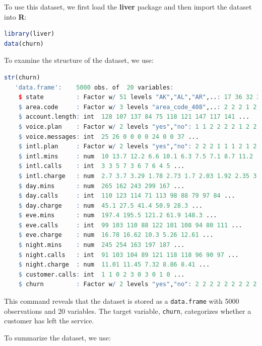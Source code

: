 \documentclass[
  11pt,
]{book}
\newcommand{\passthrough}[1]{#1}
\theoremstyle{definition}
\theoremstyle{definition}
\theoremstyle{definition}
\theoremstyle{definition}
\theoremstyle{remark}
\begin{document}
To use this dataset, we first load the \textbf{liver} package and then import the dataset into \textbf{R}:

\begin{lstlisting}[language=R]
library(liver)
data(churn)  
\end{lstlisting}

To examine the structure of the dataset, we use:

\begin{lstlisting}[language=R]
str(churn)  
   'data.frame':    5000 obs. of  20 variables:
    $ state         : Factor w/ 51 levels "AK","AL","AR",..: 17 36 32 36 37 2 20 25 19 50 ...
    $ area.code     : Factor w/ 3 levels "area_code_408",..: 2 2 2 1 2 3 3 2 1 2 ...
    $ account.length: int  128 107 137 84 75 118 121 147 117 141 ...
    $ voice.plan    : Factor w/ 2 levels "yes","no": 1 1 2 2 2 2 1 2 2 1 ...
    $ voice.messages: int  25 26 0 0 0 0 24 0 0 37 ...
    $ intl.plan     : Factor w/ 2 levels "yes","no": 2 2 2 1 1 1 2 1 2 1 ...
    $ intl.mins     : num  10 13.7 12.2 6.6 10.1 6.3 7.5 7.1 8.7 11.2 ...
    $ intl.calls    : int  3 3 5 7 3 6 7 6 4 5 ...
    $ intl.charge   : num  2.7 3.7 3.29 1.78 2.73 1.7 2.03 1.92 2.35 3.02 ...
    $ day.mins      : num  265 162 243 299 167 ...
    $ day.calls     : int  110 123 114 71 113 98 88 79 97 84 ...
    $ day.charge    : num  45.1 27.5 41.4 50.9 28.3 ...
    $ eve.mins      : num  197.4 195.5 121.2 61.9 148.3 ...
    $ eve.calls     : int  99 103 110 88 122 101 108 94 80 111 ...
    $ eve.charge    : num  16.78 16.62 10.3 5.26 12.61 ...
    $ night.mins    : num  245 254 163 197 187 ...
    $ night.calls   : int  91 103 104 89 121 118 118 96 90 97 ...
    $ night.charge  : num  11.01 11.45 7.32 8.86 8.41 ...
    $ customer.calls: int  1 1 0 2 3 0 3 0 1 0 ...
    $ churn         : Factor w/ 2 levels "yes","no": 2 2 2 2 2 2 2 2 2 2 ...
\end{lstlisting}

This command reveals that the dataset is stored as a \passthrough{\lstinline!data.frame!} with 5000 observations and 20 variables. The target variable, \passthrough{\lstinline!churn!}, categorizes whether a customer has left the service.

To summarize the dataset, we use:
\end{document}
